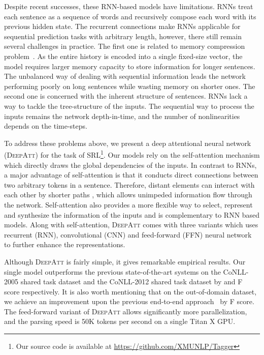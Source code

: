 \documentclass[letterpaper]{article} \usepackage{aaai18}  \usepackage{times}  \usepackage{helvet}  \usepackage{courier}  \usepackage{url}  \usepackage{graphicx}  \frenchspacing  \setlength{\pdfpagewidth}{8.5in}  \setlength{\pdfpageheight}{11in}  \usepackage{latexsym}
\begin{document}
Despite recent successes, these RNN-based models have limitations. RNNs treat each sentence as a sequence of words and recursively compose each word with its previous hidden state. The recurrent connections make RNNs applicable for sequential prediction tasks with arbitrary length, however, there still remain several challenges in practice. The first one is related to memory compression problem~\cite{cheng2016long}. As the entire history is encoded into a single fixed-size vector, the model requires larger memory capacity to store information for longer sentences. The unbalanced way of dealing with sequential information leads the network performing poorly on long sentences while wasting memory on shorter ones. The second one is concerned with the inherent structure of sentences. RNNs lack a way to tackle the tree-structure of the inputs. The sequential way to process the inputs remains the network depth-in-time, and the number of nonlinearities depends on the time-steps.

To address these problems above, we present a deep attentional neural network (\textsc{DeepAtt}) for the task of SRL\footnote{Our source code is available at \url{https://github.com/XMUNLP/Tagger}}. Our models rely on the self-attention mechanism which directly draws the global dependencies of the inputs. In contrast to RNNs, a major advantage of self-attention is that it conducts direct connections between two arbitrary tokens in a sentence. Therefore, distant elements can interact with each other by shorter paths , which allows unimpeded information flow through the network. Self-attention also provides a more flexible way to select, represent and synthesize the information of the inputs and is complementary to RNN based models. Along with self-attention, \textsc{DeepAtt} comes with three variants which uses recurrent (RNN), convolutional (CNN) and feed-forward (FFN) neural network to further enhance the representations.

Although \textsc{DeepAtt} is fairly simple, it gives remarkable empirical results. Our single model outperforms the previous state-of-the-art systems on the CoNLL-2005 shared task dataset and the CoNLL-2012 shared task dataset by  and  F score respectively. It is also worth mentioning that on the out-of-domain dataset, we achieve an improvement upon the previous end-to-end approach~\cite{he2017deep} by  F score. The feed-forward variant of \textsc{DeepAtt} allows significantly more parallelization, and the parsing speed is 50K tokens per second on a single Titan X GPU.
\end{document}
